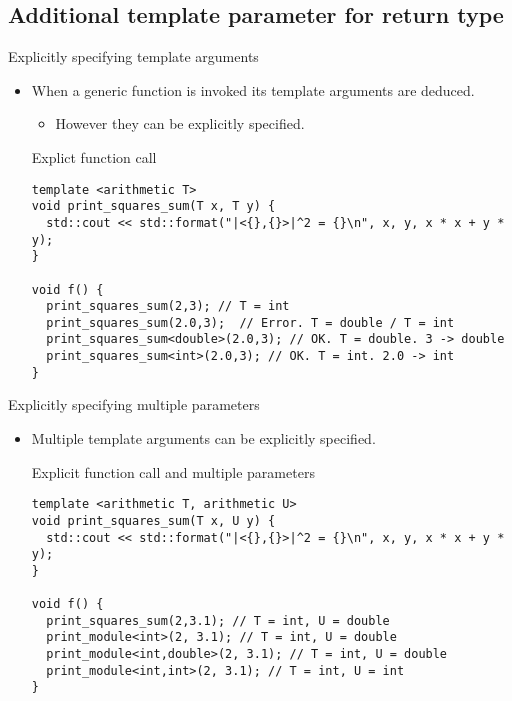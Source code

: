 \subsection{Additional template parameter for return type}

\begin{frame}[t,fragile]{Explicitly specifying template arguments}
\begin{itemize}
  \item When a generic function is invoked its template arguments are deduced.
    \begin{itemize}
      \item However they can be explicitly specified.
    \end{itemize}

\begin{block}{Explict function call}
\begin{lstlisting}
template <arithmetic T>
void print_squares_sum(T x, T y) {
  std::cout << std::format("|<{},{}>|^2 = {}\n", x, y, x * x + y * y);
}

void f() {
  print_squares_sum(2,3); // T = int
  print_squares_sum(2.0,3);  // Error. T = double / T = int
  print_squares_sum<double>(2.0,3); // OK. T = double. 3 -> double
  print_squares_sum<int>(2.0,3); // OK. T = int. 2.0 -> int
}

\end{lstlisting}
\end{block}

\end{itemize}
\end{frame}

\begin{frame}[t,fragile]{Explicitly specifying multiple parameters}
\begin{itemize}
  \item Multiple template arguments can be explicitly specified.

\begin{block}{Explicit function call and multiple parameters}
\begin{lstlisting}
template <arithmetic T, arithmetic U>
void print_squares_sum(T x, U y) {
  std::cout << std::format("|<{},{}>|^2 = {}\n", x, y, x * x + y * y);
}

void f() {
  print_squares_sum(2,3.1); // T = int, U = double
  print_module<int>(2, 3.1); // T = int, U = double
  print_module<int,double>(2, 3.1); // T = int, U = double
  print_module<int,int>(2, 3.1); // T = int, U = int
}
\end{lstlisting}
\end{block}

\end{itemize}
\end{frame}

